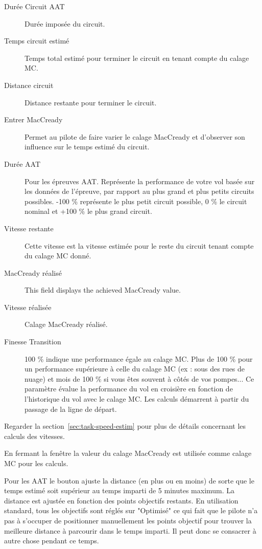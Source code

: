 \begin{description}
\item[Durée Circuit AAT]  Durée imposée du circuit.
\item[Temps circuit estimé]  Temps total estimé pour terminer le circuit en tenant compte du calage MC.
\item[Distance circuit]  Distance restante pour terminer le circuit.
\item[Entrer MacCready]  Permet au pilote de faire varier le calage MacCready et d'observer son influence sur le temps estimé du circuit.
\item[Durée AAT]  Pour les épreuves AAT. Représente la performance de votre vol basée sur les données de l'épreuve, par rapport au plus grand et plus petits circuits possibles. -100 \% représente le plus petit circuit possible, 0 \% le circuit nominal et +100 \% le plus grand circuit.
\item[Vitesse restante]  Cette vitesse est la vitesse estimée pour le reste du circuit tenant compte du calage MC donné.
\item[MacCready réalisé]  This field displays the achieved MacCready value.
\item[Vitesse réalisée]  Calage MacCready réalisé.
\item[Finesse Transition]  100 \% indique une performance égale au calage MC. Plus de 100 \% pour un performance supérieure à celle du calage MC (ex : sous des rues de nuage) et mois de 100 \% si vous êtes souvent à côtés de vos pompes... Ce paramètre évalue la performance du vol en croisière en fonction de l'historique du vol avec le calage MC. Les calculs démarrent à partir du passage de la ligne de départ.
\end{description}
Regarder la section~\ref{sec:task-speed-estim} pour plus de détails concernant les calculs des vitesses.

En fermant la fenêtre la valeur du calage MacCready est utilisée comme calage MC pour les calculs.

Pour les AAT le bouton  ajuste la distance (en plus ou en moins) de sorte que le temps estimé soit supérieur au temps imparti de 5 minutes maximum. La distance est ajustée en fonction des points objectifs restants. En utilisation standard, tous les objectifs sont réglés sur "Optimisé" ce qui fait que le pilote n'a pas à s'occuper de positionner manuellement les points objectif pour trouver la meilleure distance à parcourir dans le temps imparti. Il peut donc se consacrer à autre chose pendant ce temps.


